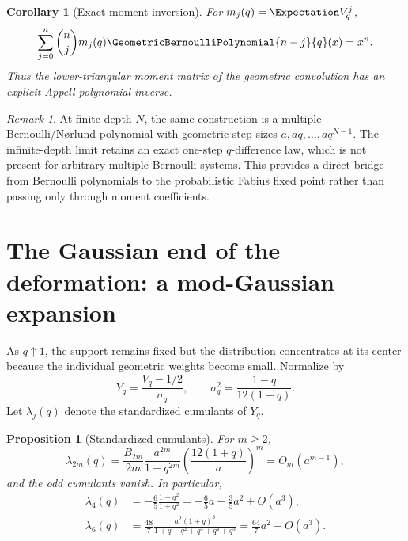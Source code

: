 \documentclass[11pt,oneside]{article}
\newtheorem{proposition}[theorem]{Proposition}
\newtheorem{corollary}[theorem]{Corollary}
\theoremstyle{definition}
\theoremstyle{remark}
\newtheorem{remark}[theorem]{Remark}
\begin{document}
\begin{corollary}[Exact moment inversion]
For $m_j(q)=\Expectation V_q^j$,
\begin{equation}
 \sum_{j=0}^{n}\binom njm_j(q)\GeometricBernoulliPolynomial{n-j}{q}(x)=x^n.
 \label{eq:moment-inversion}
\end{equation}
Thus the lower-triangular moment matrix of the geometric convolution has an explicit
Appell-polynomial inverse.
\end{corollary}

\begin{remark}
At finite depth $N$, the same construction is a multiple Bernoulli/N\o rlund
polynomial with geometric step sizes $a,aq,\dots,aq^{N-1}$.  The infinite-depth limit
retains an exact one-step $q$-difference law, which is not present for arbitrary
multiple Bernoulli systems.  This provides a direct bridge from Bernoulli polynomials
to the probabilistic Fabius fixed point rather than passing only through moment
coefficients.
\end{remark}

\section{The Gaussian end of the deformation: a mod-Gaussian expansion}
\label{sec:gaussian}

As $q\uparrow1$, the support remains fixed but the distribution concentrates at its
center because the individual geometric weights become small.  Normalize by
\begin{equation}
 Y_q=\frac{V_q-1/2}{\sigma_q},
 \qquad
 \sigma_q^2=\frac{1-q}{12(1+q)}.
 \label{eq:Yq-def}
\end{equation}
Let $\lambda_j(q)$ denote the standardized cumulants of $Y_q$.

\begin{proposition}[Standardized cumulants]
For $m\ge2$,
\begin{equation}
 \lambda_{2m}(q)=
 \frac{B_{2m}}{2m}\frac{a^{2m}}{1-q^{2m}}
 \left(\frac{12(1+q)}a\right)^m
 =O_m(a^{m-1}),
 \label{eq:standardized-cumulants}
\end{equation}
and the odd cumulants vanish.  In particular,
\begin{align}
 \lambda_4(q)&=-\frac65\frac{1-q^2}{1+q^2}
 =-\frac65a-\frac35a^2+O(a^3),\label{eq:lambda4}\\
 \lambda_6(q)&=\frac{48}{7}\frac{a^2(1+q)^3}{1+q+q^2+q^3+q^4+q^5}
 =\frac{64}{7}a^2+O(a^3).
 \label{eq:lambda6}
\end{align}
\end{proposition}
\end{document}
